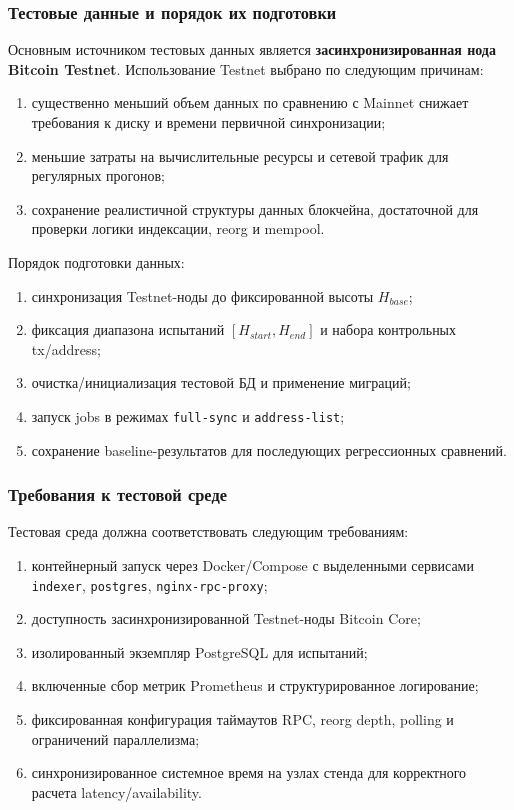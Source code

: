 ﻿\documentclass[14pt,a4paper]{extarticle}
\begin{document}
\subsubsection{Тестовые данные и порядок их подготовки}
\noindent Основным источником тестовых данных является \textbf{засинхронизированная нода Bitcoin Testnet}. Использование Testnet выбрано по следующим причинам:
\begin{enumerate}
  \item существенно меньший объем данных по сравнению с Mainnet снижает требования к диску и времени первичной синхронизации;
  \item меньшие затраты на вычислительные ресурсы и сетевой трафик для регулярных прогонов;
  \item сохранение реалистичной структуры данных блокчейна, достаточной для проверки логики индексации, reorg и mempool.
\end{enumerate}
\noindent Порядок подготовки данных:
\begin{enumerate}
  \item синхронизация Testnet-ноды до фиксированной высоты $H_{base}$;
  \item фиксация диапазона испытаний $[H_{start}, H_{end}]$ и набора контрольных tx/address;
  \item очистка/инициализация тестовой БД и применение миграций;
  \item запуск jobs в режимах \texttt{full-sync} и \texttt{address-list};
  \item сохранение baseline-результатов для последующих регрессионных сравнений.
\end{enumerate}

\subsubsection{Требования к тестовой среде}
\noindent Тестовая среда должна соответствовать следующим требованиям:
\begin{enumerate}
  \item контейнерный запуск через Docker/Compose с выделенными сервисами \texttt{indexer}, \texttt{postgres}, \texttt{nginx-rpc-proxy};
  \item доступность засинхронизированной Testnet-ноды Bitcoin Core;
  \item изолированный экземпляр PostgreSQL для испытаний;
  \item включенные сбор метрик Prometheus и структурированное логирование;
  \item фиксированная конфигурация таймаутов RPC, reorg depth, polling и ограничений параллелизма;
  \item синхронизированное системное время на узлах стенда для корректного расчета latency/availability.
\end{enumerate}
\end{document}
